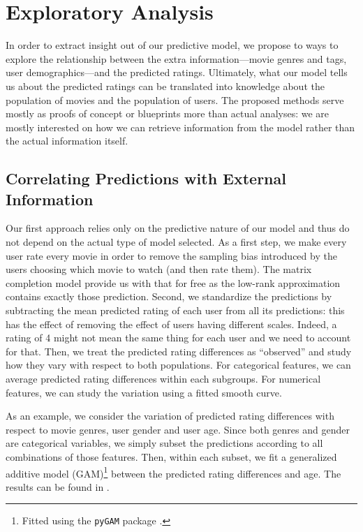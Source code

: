 \documentclass[bj, preprint]{imsart}
\begin{document}



\section{Exploratory Analysis}\label{sec:explore}

In order to extract insight out of our predictive model, we propose to ways to explore the relationship between the extra information---movie genres and tags, user demographics---and the predicted ratings. Ultimately, what our model tells us about the predicted ratings can be translated into knowledge about the population of movies and the population of users. The proposed methods serve mostly as proofs of concept or blueprints more than actual analyses: we are mostly interested on how we can retrieve information from the model rather than the actual information itself.

\subsection{Correlating Predictions with External Information}\label{subsec:explore.corr}

Our first approach relies only on the predictive nature of our model and thus do not depend on the actual type of model selected. As a first step, we make every user rate every movie in order to remove the sampling bias introduced by the users choosing which movie to watch (and then rate them). The matrix completion model provide us with that for free as the low-rank approximation contains exactly those prediction. Second, we standardize the predictions by subtracting the mean predicted rating of each user from all its predictions: this has the effect of removing the effect of users having different scales. Indeed, a rating of 4 might not mean the same thing for each user and we need to account for that. Then, we treat the predicted rating differences as ``observed'' and study how they vary with respect to both populations. For categorical features, we can average predicted rating differences within each subgroups. For numerical features, we can study the variation using a fitted smooth curve.

As an example, we consider the variation of predicted rating differences with respect to movie genres, user gender and user age. Since both genres and gender are categorical variables, we simply subset the predictions according to all combinations of those features. Then, within each subset, we fit a generalized additive model (GAM)\footnote{Fitted using the \texttt{pyGAM} package \citep{pygam}.} between the predicted rating differences and age. The results can be found in .
\end{document}

